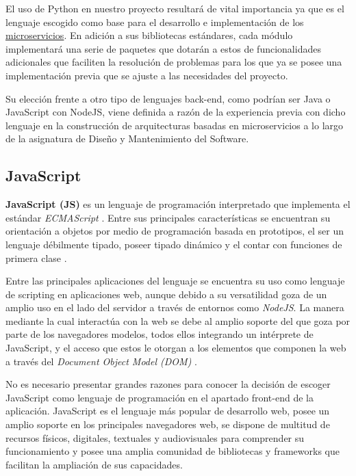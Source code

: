 El uso de Python en nuestro proyecto resultará de vital importancia ya que es el lenguaje escogido como base para el desarrollo e implementación de los \hyperref[sec:microservicios]{microservicios}. En adición a sus bibliotecas estándares, cada módulo implementará una serie de paquetes que dotarán a estos de funcionalidades adicionales que faciliten la resolución de problemas para los que ya se posee una implementación previa que se ajuste a las necesidades del proyecto.

Su elección frente a otro tipo de lenguajes back-end, como podrían ser Java o JavaScript con NodeJS, viene definida a razón de la experiencia previa con dicho lenguaje en la construcción de arquitecturas basadas en microservicios a lo largo de la asignatura de Diseño y Mantenimiento del Software.


\subsection{JavaScript}

\textbf{JavaScript (JS)} \cite{lang:javascript} es un lenguaje de programación interpretado que implementa el estándar \emph{ECMAScript} \cite{tech:ecmascript}. Entre sus principales características se encuentran su orientación a objetos por medio de programación basada en prototipos, el ser un lenguaje débilmente tipado, poseer tipado dinámico y el contar con funciones de primera clase \cite{tech:first_class_func}.

Entre las principales aplicaciones del lenguaje se encuentra su uso como lenguaje de scripting en aplicaciones web, aunque debido a su versatilidad goza de un amplio uso en el lado del servidor a través de entornos como \emph{NodeJS}. La manera mediante la cual interactúa con la web se debe al amplio soporte del que goza por parte de los navegadores modelos, todos ellos integrando un intérprete de JavaScript, y el acceso que estos le otorgan a los elementos que componen la web a través del \emph{Document Object Model (DOM)} \cite{tech:dom}.

No es necesario presentar grandes razones para conocer la decisión de escoger JavaScript como lenguaje de programación en el apartado front-end de la aplicación. JavaScript es el lenguaje más popular de desarrollo web, posee un amplio soporte en los principales navegadores web, se dispone de multitud de recursos físicos, digitales, textuales y audiovisuales para comprender su funcionamiento y posee una amplia comunidad de bibliotecas y frameworks que facilitan la ampliación de sus capacidades.

